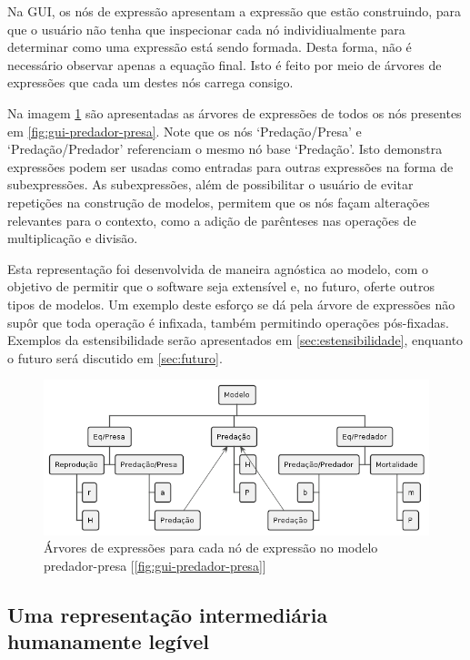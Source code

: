 \documentclass[
	12pt,				%
	openright,			%
	oneside,			%
	a4paper,			%
	main=brazil,
	english,			%
	]{ufsj-abntex2}
\begin{document}
Na GUI, os nós de expressão apresentam a expressão que estão construindo, para que o usuário não tenha que inspecionar cada nó individiualmente para determinar como uma expressão está sendo formada. Desta forma, não é necessário observar apenas a equação final. Isto é feito por meio de árvores de expressões que cada um destes nós carrega consigo.

Na imagem \ref{fig:expr-tree} são apresentadas as árvores de expressões de todos os nós presentes em \ref{fig:gui-predador-presa}. Note que os nós `Predação/Presa' e `Predação/Predador' referenciam o mesmo nó base `Predação'. Isto demonstra expressões podem ser usadas como entradas para outras expressões na forma de subexpressões. As subexpressões, além de possibilitar o usuário de evitar repetições na construção de modelos, permitem que os nós façam alterações relevantes para o contexto, como a adição de parênteses nas operações de multiplicação e divisão.

Esta representação foi desenvolvida de maneira agnóstica ao modelo, com o objetivo de permitir que o software seja extensível e, no futuro, oferte outros tipos de modelos. Um exemplo deste esforço se dá pela árvore de expressões não supôr que toda operação é infixada, também permitindo operações pós-fixadas. Exemplos da estensibilidade serão apresentados em \ref{sec:estensibilidade}, enquanto o futuro será discutido em \ref{sec:futuro}.

\begin{figure}[h]
    \centering
    \includegraphics[scale=0.63]{diagrams/img/expr-tree.png} 
    \caption{Árvores de expressões para cada nó de expressão no modelo predador-presa [\ref{fig:gui-predador-presa}]}
    \label{fig:expr-tree}
\end{figure}

\subsection{Uma representação intermediária humanamente legível}
\label{subsection:RI}
\end{document}
